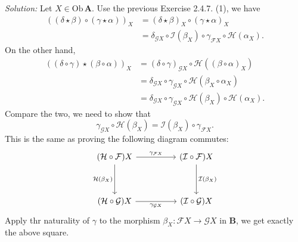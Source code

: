 \documentclass[a4paper, 12pt]{article}
\newenvironment{solution}
    {\textit{Solution:}}
    {}
\begin{document}
\begin{solution}
Let \(X\in \text{Ob}\, \mathbf{A}\). Use the previous Exercise 2.4.7. (1), we have 
\begin{align*}
    ((\delta\star\beta)\circ(\gamma\star\alpha))_X 
    & =(\delta\star\beta)_X\circ(\gamma\star\alpha)_X \\ 
    & =\delta_{\mathcal{G}X}\circ \mathcal{I}(\beta_X)\circ \gamma_{\mathcal{F}X}\circ \mathcal{H}(\alpha_X).
\end{align*}
On the other hand, 
\begin{align*}
    ((\delta\circ \gamma)\star(\beta\circ\alpha))_X & = (\delta\circ\gamma)_{\mathcal{G}X}\circ \mathcal{H}((\beta\circ\alpha)_X)\\ 
                                                    & = \delta_{\mathcal{G}X}\circ \gamma_{\mathcal{G}X}\circ \mathcal{H}(\beta_X\circ\alpha_X)\\ 
                                                    & = \delta_{\mathcal{G}X}\circ \gamma_{\mathcal{G}X}\circ \mathcal{H}(\beta_X)\circ \mathcal{H}(\alpha_X). 
\end{align*}  
Compare the two, we need to show that 
$$\gamma_{\mathcal{G}X}\circ \mathcal{H}(\beta_X)=\mathcal{I}(\beta_X)\circ \gamma_{\mathcal{F}X}.$$
This is the same as proving the following diagram commutes: 
$$\begin{tikzcd}
	{(\mathcal{H}\circ\mathcal{F})X} && {(\mathcal{I}\circ\mathcal{F})X} \\
	\\
	{(\mathcal{H}\circ\mathcal{G})X} && {(\mathcal{I}\circ\mathcal{G})X}
	\arrow["{\gamma_{\mathcal{F}X}}", from=1-1, to=1-3]
	\arrow["{\mathcal{H}(\beta_X)}"', from=1-1, to=3-1]
	\arrow["{\mathcal{I}(\beta_X)}", from=1-3, to=3-3]
	\arrow["{\gamma_{\mathcal{G}X}}"', from=3-1, to=3-3]
\end{tikzcd}$$
Apply thr naturality of \(\gamma\) to the morphism \(\beta_X:\mathcal{F}X\rightarrow \mathcal{G}X\) in \(\mathbf{B}\), we get exactly the above square. 
\end{solution}
\\ 
\end{document}
